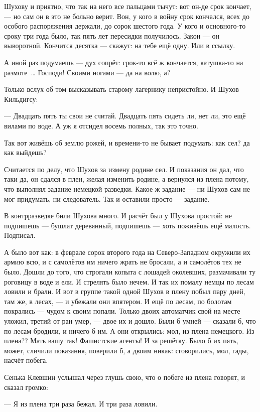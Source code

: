 Шухову и приятно, что так на него все пальцами тычут: вот он-де срок кончает, --- но сам он в это не больно верит. Вон, у кого в войну срок кончался, всех до особого распоряжения держали, до сорок шестого года. У кого и основного-то сроку три года было, так пять лет пересидки получилось. Закон --- он выворотной. Кончится десятка --- скажут: на тебе ещё одну. Или в ссылку.

А иной раз подумаешь --- дух сопрёт: срок-то всё ж кончается, ка\-туш\-ка-то на размоте~\dots{} Господи! Своими ногами --- да на волю, а?

Только вслух об том высказывать старому лагернику непристойно. И Шухов Кильдигсу:

--- Двадцать пять ты свои не считай. Двадцать пять сидеть ли, нет ли, это ещё вилами по воде. А уж я отсидел восемь полных, так это точно.

Так вот живёшь об землю рожей, и времени-то не бывает подумать: как сел? да как выйдешь?

Считается по делу, что Шухов за измену родине сел. И показания он дал, что таки да, он сдался в плен, желая изменить родине, а вернулся из плена потому, что выполнял задание немецкой разведки. Какое ж задание --- ни Шухов сам не мог придумать, ни следователь. Так и оставили просто --- задание.

В контрразведке били Шухова много. И расчёт был у Шухова простой: не подпишешь --- бушлат деревянный, подпишешь --- хоть поживёшь ещё малость. Подписал.

А было вот как: в феврале сорок второго года на Северо-Западном окружили их армию всю, и с самолётов им ничего жрать не бросали, а и самолётов тех не было. Дошли до того, что строгали копыта с лошадей околевших, размачивали ту роговицу в воде и ели. И стрелять было нечем. И так их помалу немцы по лесам ловили и брали. И вот в группе такой одной Шухов в плену побыл пару дней, там же, в лесах, --- и убежали они впятером. И ещё по лесам, по болотам покрались --- чудом к своим попали. Только двоих автоматчик свой на месте уложил, третий от ран умер, --- двое их и дошло. Были б умней --- сказали б, что по лесам бродили, и ничего б им. А они открылись: мол, из плена немецкого. Из плена?? Мать вашу так! Фашистские агенты! И за решётку. Было б их пять, может, сличили показания, поверили б, а двоим никак: сговорились, мол, гады, насчёт побега.

Сенька Клевшин услышал через глушь свою, что о побеге из плена говорят, и сказал громко:

--- Я из плена три раза бежал. И три раза ловили.

